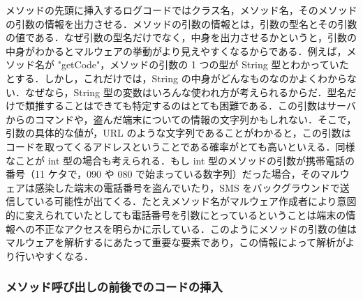 メソッドの先頭に挿入するログコードではクラス名，メソッド名，そのメソッドの引数の情報を出力させる．メソッドの引数の情報とは，引数の型名とその引数の値である．なぜ引数の型名だけでなく，中身を出力させるかというと，引数の中身がわかるとマルウェアの挙動がより見えやすくなるからである．例えば，メソッド名が "getCode"，メソッドの引数の 1 つの型が String 型とわかっていたとする．しかし，これだけでは，String の中身がどんなものなのかよくわからない．なぜなら，String 型の変数はいろんな使われ方が考えられるからだ．型名だけで類推することはできても特定するのはとても困難である．この引数はサーバからのコマンドや，盗んだ端末についての情報の文字列かもしれない．そこで，引数の具体的な値が，URL のような文字列であることがわかると，この引数はコードを取ってくるアドレスということである確率がとても高いといえる．同様なことが int 型の場合も考えられる．もし int 型のメソッドの引数が携帯電話の番号（11 ケタで，090 や 080 で始まっている数字列）だった場合，そのマルウェアは感染した端末の電話番号を盗んでいたり，SMS をバックグラウンドで送信している可能性が出てくる．たとえメソッド名がマルウェア作成者により意図的に変えられていたとしても電話番号を引数にとっているということは端末の情報への不正なアクセスを明らかに示している．このようにメソッドの引数の値はマルウェアを解析するにあたって重要な要素であり，この情報によって解析がより行いやすくなる．

\subsubsection{メソッド呼び出しの前後でのコードの挿入}
\label{methodcalls}


